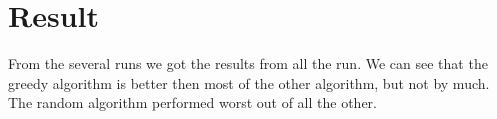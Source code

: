 \chapter{Result}
From the several runs we got the results from all the run. We can see that the greedy algorithm is better then most of the other algorithm, but not by much. The random algorithm performed worst out of all the other. 
